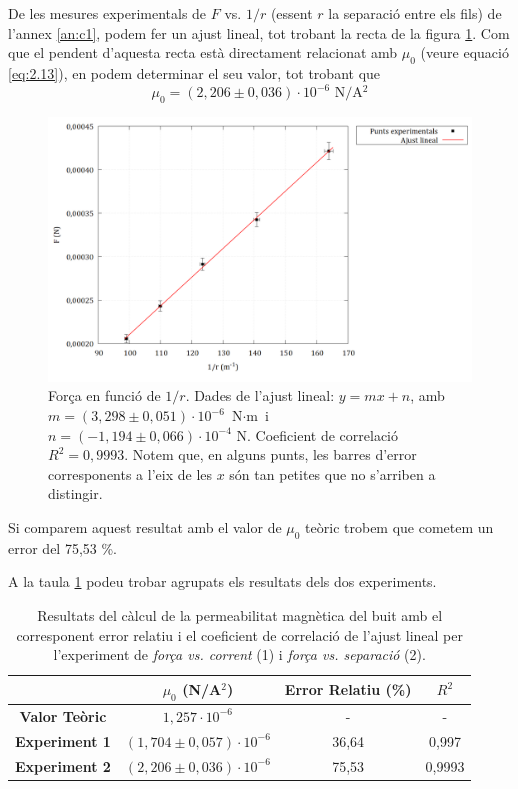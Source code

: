 \documentclass[a4paper,10.5pt]{report}
\begin{document}
De les mesures experimentals de $F$ vs. $1/r$ (essent $r$ la separació entre els fils) de l'annex \ref{an:c1}, podem fer un ajust lineal, tot trobant la recta de la figura \ref{fig:2.5}. Com que el pendent d'aquesta recta està directament relacionat amb $\mu_0$ (veure equació \eqref{eq:2.13}), en podem determinar el seu valor, tot trobant que 
\begin{equation*}
	\mu_0 = (2,206 \pm 0,036)\cdot 10^{-6}\text{ N$/$A$^2$}
\end{equation*}

\begin{figure}[H]
	\centering
	\includegraphics[width=0.9\linewidth]{filsexper}
	\caption{Força en funció de $1/r$. Dades de l'ajust lineal: $y=mx+n$, amb $m = (3,298\pm0,051)\cdot 10^{-6} \text{ N$\cdot$m}$ i $n=(-1,194\pm 0,066)\cdot10^{-4} \text{ N}$. Coeficient de correlació $R^2=0,9993$. Notem que, en alguns punts, les barres d'error corresponents a l'eix de les $x$ són tan petites que no s'arriben a distingir.}
	\label{fig:2.5}
\end{figure}

Si comparem aquest resultat amb el valor de $\mu_0$ teòric trobem que cometem un error del 75,53 \%.

A la taula \ref{tab:2.1} podeu trobar agrupats els resultats dels dos experiments.
\begin{table}[h]
	\centering
	\caption{Resultats del càlcul de la permeabilitat magnètica del buit amb el corresponent error relatiu i el coeficient de correlació de l'ajust lineal per l'experiment de \textit{força vs. corrent} (1) i \textit{força vs. separació} (2).}
	\begin{tabular}{cccc}
		\toprule
		& $\mu_0$ (N/A$^2$) & Error Relatiu (\%) & $R^2$ \\
		\midrule
		\textbf{Valor Teòric} & $1,257\cdot10^{-6}$ & - & - \\
		\textbf{Experiment 1} & $(1,704\pm0,057)\cdot 10^{-6}$ & 36,64 & 0,997 \\
		\textbf{Experiment 2} & $(2,206\pm0,036)\cdot 10^{-6}$ & 75,53 & 0,9993 \\
		\bottomrule
	\end{tabular}
	\label{tab:2.1}
\end{table}
\end{document}
